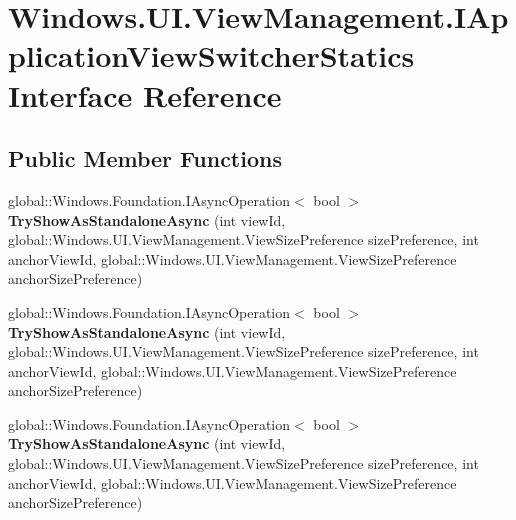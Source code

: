 \hypertarget{interface_windows_1_1_u_i_1_1_view_management_1_1_i_application_view_switcher_statics}{}\section{Windows.\+U\+I.\+View\+Management.\+I\+Application\+View\+Switcher\+Statics Interface Reference}
\label{interface_windows_1_1_u_i_1_1_view_management_1_1_i_application_view_switcher_statics}
\subsection*{Public Member Functions}
\begin{DoxyCompactItemize}
\item 
\mbox{\label{interface_windows_1_1_u_i_1_1_view_management_1_1_i_application_view_switcher_statics_a8d678f11615411f739842f3002f360f0}} 
global\+::\+Windows.\+Foundation.\+I\+Async\+Operation$<$ bool $>$ {\bfseries Try\+Show\+As\+Standalone\+Async} (int view\+Id, global\+::\+Windows.\+U\+I.\+View\+Management.\+View\+Size\+Preference size\+Preference, int anchor\+View\+Id, global\+::\+Windows.\+U\+I.\+View\+Management.\+View\+Size\+Preference anchor\+Size\+Preference)
\item 
\mbox{\label{interface_windows_1_1_u_i_1_1_view_management_1_1_i_application_view_switcher_statics_a8d678f11615411f739842f3002f360f0}} 
global\+::\+Windows.\+Foundation.\+I\+Async\+Operation$<$ bool $>$ {\bfseries Try\+Show\+As\+Standalone\+Async} (int view\+Id, global\+::\+Windows.\+U\+I.\+View\+Management.\+View\+Size\+Preference size\+Preference, int anchor\+View\+Id, global\+::\+Windows.\+U\+I.\+View\+Management.\+View\+Size\+Preference anchor\+Size\+Preference)
\item 
\mbox{\label{interface_windows_1_1_u_i_1_1_view_management_1_1_i_application_view_switcher_statics_a8d678f11615411f739842f3002f360f0}} 
global\+::\+Windows.\+Foundation.\+I\+Async\+Operation$<$ bool $>$ {\bfseries Try\+Show\+As\+Standalone\+Async} (int view\+Id, global\+::\+Windows.\+U\+I.\+View\+Management.\+View\+Size\+Preference size\+Preference, int anchor\+View\+Id, global\+::\+Windows.\+U\+I.\+View\+Management.\+View\+Size\+Preference anchor\+Size\+Preference)

\end{DoxyCompactItemize}
